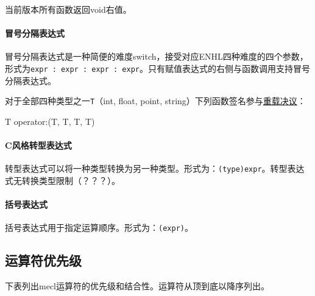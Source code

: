 \documentclass{article}
\begin{document}
当前版本所有函数返回void右值。

\paragraph{冒号分隔表达式} 冒号分隔表达式是一种简便的难度switch，接受对应ENHL四种难度的四个参数，形式为\verb|expr : expr : expr : expr|。只有赋值表达式的右侧与函数调用支持冒号分隔表达式。

对于全部四种类型之一\verb|T|（int, float, point, string）下列函数签名参与\hyperref[chongzai]{重载决议}：
\begin{MUAvbt}
T operator:(T, T, T, T)
\end{MUAvbt}

\paragraph{C风格转型表达式} 转型表达式可以将一种类型转换为另一种类型。形式为：\verb|(type)expr|。转型表达式无转换类型限制（？？？）。

\paragraph{括号表达式} 括号表达式用于指定运算顺序。形式为：\verb|(expr)|。

\subsection{运算符优先级}

下表列出mecl运算符的优先级和结合性。运算符从顶到底以降序列出。
\end{document}
